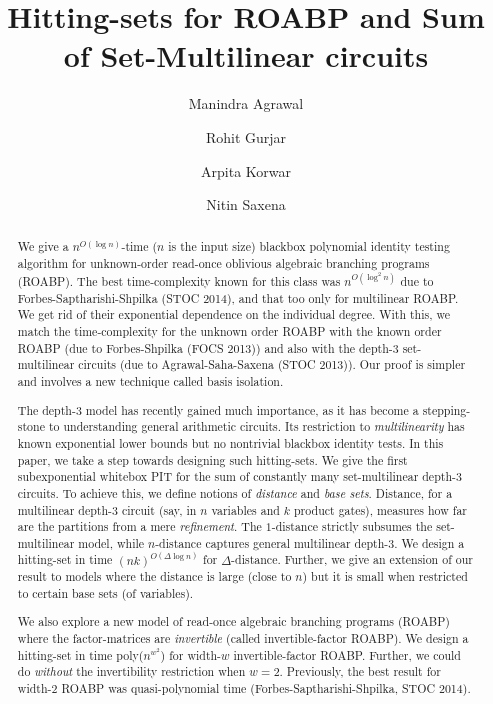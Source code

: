 \documentclass[final,oneeqnum, onethmnum, onefignum]{siamltex1213}
\title{Hitting-sets for ROABP and Sum of Set-Multilinear circuits}%
\author{Manindra Agrawal \and Rohit Gurjar \and Arpita Korwar \and Nitin Saxena }
\newcommand{\di}{\Delta} %
\begin{document}
\maketitle


\begin{abstract}
We give a $n^{O(\log n)}$-time ($n$ is the input size) blackbox 
polynomial identity testing algorithm for unknown-order read-once oblivious
algebraic branching programs (ROABP). The best time-complexity known for this class
was $n^{O(\log^2 n)}$ due to Forbes-Saptharishi-Shpilka (STOC 2014), and
that too only for multilinear ROABP. 
We get rid of their exponential dependence on the individual degree.
With this, we match the time-complexity for the unknown order ROABP with 
the known order ROABP (due to Forbes-Shpilka (FOCS 2013)) and also with the
depth-$3$ set-multilinear circuits (due to Agrawal-Saha-Saxena (STOC 2013)).
Our proof is simpler and involves a new technique called basis isolation.

The depth-$3$ model has recently gained much importance, 
as it has become a stepping-stone to understanding general arithmetic circuits. 
Its restriction to {\em multilinearity} has known exponential lower bounds but 
no nontrivial blackbox identity tests. 
In this paper, we take a step towards designing such hitting-sets. 
We give the first subexponential whitebox PIT 
for the sum of constantly many set-multilinear depth-$3$ circuits.
To achieve this, we define notions of {\em distance} and {\em base sets}. 
Distance, for a multilinear 
depth-$3$ circuit (say, in $n$ variables and $k$ product gates),  
measures how far are the partitions from a mere {\em refinement}. 
The $1$-distance strictly subsumes the set-multilinear model, 
while $n$-distance captures general multilinear depth-$3$. 
We design a hitting-set in time $(nk)^{O(\di \log n)}$ for $\di$-distance. 
Further, we give an extension of our result to models where the distance is large 
(close to $n$) but it is small when restricted to certain base sets (of variables).

We also explore a new model of read-once algebraic branching programs (ROABP) where the factor-matrices are {\em invertible} (called invertible-factor ROABP). We design a hitting-set in time poly($n^{w^2}$) for width-$w$ invertible-factor ROABP. Further, we could do {\em without} the invertibility restriction when $w=2$. Previously, the best result for width-$2$ ROABP was quasi-polynomial time (Forbes-Saptharishi-Shpilka, STOC 2014).

\end{abstract}
\end{document}

